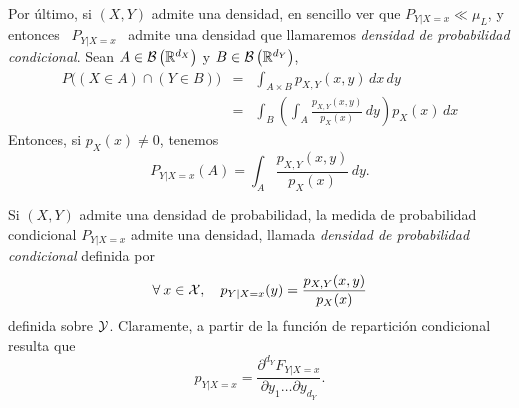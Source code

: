
Por \'ultimo, si $(X,Y)$ admite una densidad, en sencillo ver que $P_{Y|X=x} \ll
\mu_L$,  y entonces  \ $P_{Y|X=x}$  \ admite  una densidad  que  llamaremos {\it
  densidad  de  probabilidad  condicional}.  Sean $A  \in  \mathcal{B}\left(  \mathbb{R}^{d_X}
\right)$ y $B \in \mathcal{B}\left( \mathbb{R}^{d_Y} \right)$,
%
\begin{eqnarray*}
P\Big( (X \in A) \cap (Y \in B) \Big) & = & \int_{A \times B} p_{X,Y}(x,y) \, dx \, dy\\[2mm]
%
& = & \int_B \left( \int_A \frac{p_{X,Y}(x,y)}{p_X(x)} \, dy \right) p_X(x) \, dx
\end{eqnarray*}
%
Entonces, si $p_X(x) \ne 0$, tenemos
%
\[
P_{Y|X=x}(A) = \int_A \frac{p_{X,Y}(x,y)}{p_X(x)} \, dy.
\]
%
\begin{teorema}
\label{Def:MP:DensidadCondicional}
%
  Si  $(X,Y)$ admite  una densidad  de probabilidad,  la medida  de probabilidad
  condicional  $P_{Y|X=x}$  admite  una   densidad,  llamada  {\it  densidad  de
    probabilidad condicional} definida por
  \[
  \forall \: x \in \mathcal{X}, \quad p_{Y|X=x}(y) = \frac{p_{X,Y}(x,y)}{p_X(x)}
  \]
  definida  sobre $\mathcal{Y}$. Claramente,  a partir de  la funci\'on  de repartici\'on
  condicional resulta que
  \[
  p_{Y|X=x} = \frac{\partial^{d_Y}  F_{Y|X=x}}{\partial y_1 \ldots \partial y_{d_Y}}.
  \]
\end{teorema}

